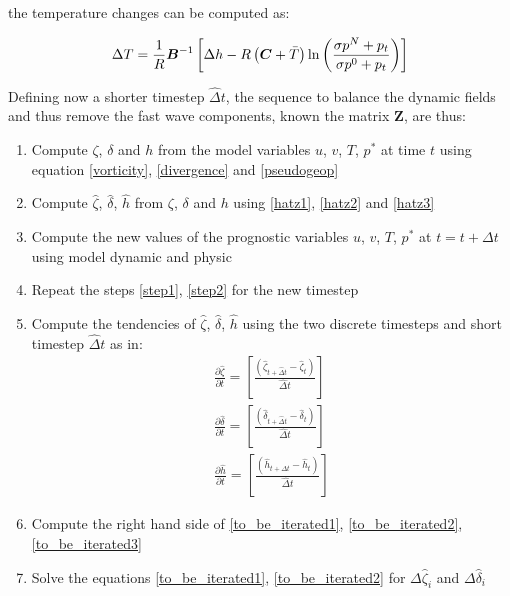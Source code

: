 the temperature changes can be computed as:

\begin{gather}
  \label{tchange}
  \Delta T = \frac{1}{R} \bm{B}^{-1} \left[ \Delta h - R
  \left( \bm{C} + \bar{T}\right) \ln \left(
  \frac{\sigma p^N + p_t}{\sigma p^0 + p_t}\right) \right]
\end{gather}

Defining now a shorter timestep $\hat{\Delta} t$, the sequence
to balance the dynamic fields and thus remove the fast wave components,
known the matrix $\bm{Z}$, are thus:

\begin{enumerate}
  \item \label{step1} Compute $\zeta$, $\delta$ and $h$ from the model
    variables $u$, $v$, $T$, $p^{\ast}$ at time $t$ using
    equation \ref{vorticity}, \ref{divergence} and
    \ref{pseudogeop}
  \item \label{step2} Compute $\hat{\zeta}$, $\hat{\delta}$, $\hat{h}$
    from $\zeta$, $\delta$ and $h$ using \ref{hatz1}, \ref{hatz2}
    and \ref{hatz3}
  \item Compute the new values of the prognostic variables
    $u$, $v$, $T$, $p^{\ast}$ at $t = t + \Delta t$ using
    model dynamic and physic
  \item Repeat the steps \ref{step1}, \ref{step2} for the new timestep
  \item Compute the tendencies of $\hat{\zeta}$, $\hat{\delta}$, $\hat{h}$
    using the two discrete timesteps and short timestep
    $\hat{\Delta} t$ as in:
    \begin{gather}
      \frac{\partial \hat{\zeta}}{\partial t} = 
      \left[ \frac{\left( \hat{\zeta}_{t+\hat{\Delta} t} -
           \hat{\zeta}_t \right)}{\hat{\Delta} t} \right] \\
      \frac{\partial \hat{\delta}}{\partial t} = 
      \left[ \frac{\left( \hat{\delta}_{t+\hat{\Delta} t} -
           \hat{\delta}_t \right)}{\hat{\Delta} t} \right] \\
      \frac{\partial \hat{h}}{\partial t} = 
      \left[ \frac{\left( \hat{h}_{t+\Delta t} -
           \hat{h}_t \right)}{\hat{\Delta} t} \right]
    \end{gather}
  \item Compute the right hand side of \ref{to_be_iterated1},
    \ref{to_be_iterated2}, \ref{to_be_iterated3}
  \item Solve the equations \ref{to_be_iterated1}, \ref{to_be_iterated2}
    for $\Delta \hat{\zeta}_i$ and $\Delta \hat{\delta}_i$

\end{enumerate}
